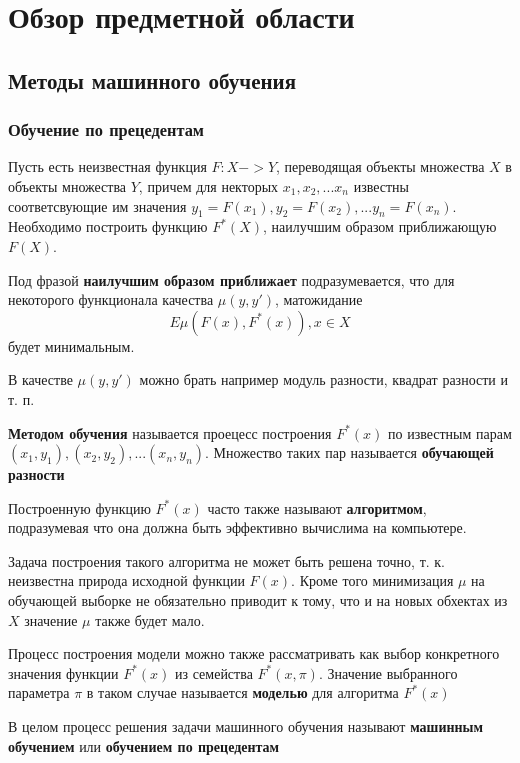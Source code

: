 \newpage
\section{Обзор предметной области}
\label{review}

\subsection{Методы машинного обучения} 
\label{ML}
\subsubsection{Обучение по прецедентам}
Пусть есть неизвестная функция $F: X -> Y$, переводящая объекты
множества $X$ в объекты множества $Y$, причем для некторых $x_1, x_2, ... x_n$ известны соответсвующие им значения $y_1 = F(x_1), y_2 = F(x_2), ... y_n = F(x_n)$.
Необходимо построить функцию $F^*(X)$, наилучшим образом приближающую $F(X)$.

Под фразой \textbf{наилучшим образом приближает} подразумевается, что для некоторого функционала качества $\mu(y, y')$, матожидание
\begin{equation}
\label{}
E\mu(F(x), F^*(x)), x \in X
\end{equation}
будет минимальным.

В качестве $\mu(y, y')$ можно брать например модуль разности, квадрат разности и т. п.

\textbf{Методом обучения} называется проецесс построения $F^*(x)$ по известным парам $(x_1, y_1), (x_2, y_2), ... (x_n, y_n)$. Множество таких пар называется \textbf{обучающей разности}

Построенную функцию $F^*(x)$ часто также называют \textbf{алгоритмом}, подразумевая что она должна быть эффективно вычислима на компьютере.

Задача построения такого алгоритма не может быть решена точно, т. к. неизвестна природа исходной функции $F(x)$. Кроме того минимизация $\mu$ на обучающей выборке не обязательно приводит к тому, что и на новых обхектах из $X$ значение $\mu$ также будет мало.

Процесс построения модели можно также рассматривать как выбор конкретного значения функции $F^*(x)$ из семейства $F^*(x, \pi)$. Значение выбранного параметра $\pi$ в таком случае называется \textbf{моделью} для алгоритма
$F^*(x)$

В целом процесс решения задачи машинного обучения называют \textbf{машинным обучением} или \textbf{обучением по прецедентам}

